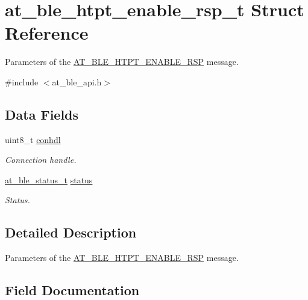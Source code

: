 \hypertarget{structat__ble__htpt__enable__rsp__t}{}\section{at\+\_\+ble\+\_\+htpt\+\_\+enable\+\_\+rsp\+\_\+t Struct Reference}
\label{structat__ble__htpt__enable__rsp__t}


Parameters of the \mbox{\hyperlink{at__ble__api_8h_a3324640b95f33169515f89738ed5baeba0217704aaf8283258dd02858769e6008}{A\+T\+\_\+\+B\+L\+E\+\_\+\+H\+T\+P\+T\+\_\+\+E\+N\+A\+B\+L\+E\+\_\+\+R\+SP}} message.  




{\ttfamily \#include $<$at\+\_\+ble\+\_\+api.\+h$>$}

\subsection*{Data Fields}
\begin{DoxyCompactItemize}
\item 
uint8\+\_\+t \mbox{\hyperlink{structat__ble__htpt__enable__rsp__t_a92cddd82111862a20ab6ed3a6a7f9ea2}{conhdl}}
\begin{DoxyCompactList}\small\item\em Connection handle. \end{DoxyCompactList}\item 
\mbox{\hyperlink{group__error__codes__group_ga3b1db9b95feb157b3c188ca27fe76988}{at\+\_\+ble\+\_\+status\+\_\+t}} \mbox{\hyperlink{structat__ble__htpt__enable__rsp__t_a0b48093fc2030779fc47e5216f8019e2}{status}}
\begin{DoxyCompactList}\small\item\em Status. \end{DoxyCompactList}\end{DoxyCompactItemize}


\subsection{Detailed Description}
Parameters of the \mbox{\hyperlink{at__ble__api_8h_a3324640b95f33169515f89738ed5baeba0217704aaf8283258dd02858769e6008}{A\+T\+\_\+\+B\+L\+E\+\_\+\+H\+T\+P\+T\+\_\+\+E\+N\+A\+B\+L\+E\+\_\+\+R\+SP}} message. 

\subsection{Field Documentation}
\mbox{\label{structat__ble__htpt__enable__rsp__t_a92cddd82111862a20ab6ed3a6a7f9ea2}} 
